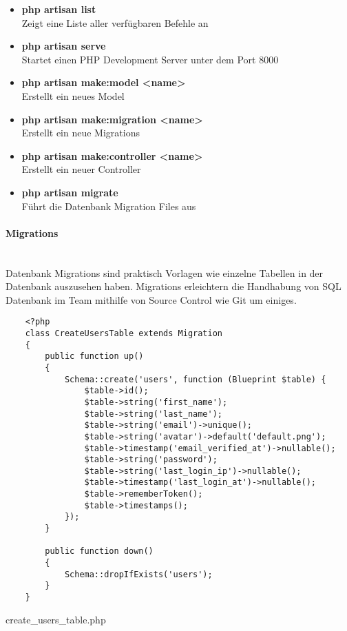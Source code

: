 \begin{itemize}
  \item \textbf{php artisan list}\\
  Zeigt eine Liste aller verfügbaren Befehle an
  \item \textbf{php artisan serve}\\
  Startet einen PHP Development Server unter dem Port 8000
  \item \textbf{php artisan make:model <name>}\\
  Erstellt ein neues Model
  \item \textbf{php artisan make:migration <name>}\\
  Erstellt ein neue Migrations
  \item \textbf{php artisan make:controller <name>}\\
  Erstellt ein neuer Controller
  \item \textbf{php artisan migrate}\\
  Führt die Datenbank Migration Files aus
\end{itemize}

\paragraph{Migrations}\mbox{}\\
Datenbank Migrations sind praktisch Vorlagen wie einzelne Tabellen in der
Datenbank auszusehen haben. Migrations erleichtern die Handhabung von SQL
Datenbank im Team mithilfe von Source Control wie Git um einiges.

\begin{listing}[H]
  \begin{verbatim}
    <?php
    class CreateUsersTable extends Migration
    {
        public function up()
        {
            Schema::create('users', function (Blueprint $table) {
                $table->id();
                $table->string('first_name');
                $table->string('last_name');
                $table->string('email')->unique();
                $table->string('avatar')->default('default.png');
                $table->timestamp('email_verified_at')->nullable();
                $table->string('password');
                $table->string('last_login_ip')->nullable();
                $table->timestamp('last_login_at')->nullable();
                $table->rememberToken();
                $table->timestamps();
            });
        }
    
        public function down()
        {
            Schema::dropIfExists('users');
        }
    }
  \end{verbatim}
  \caption{create\_users\_table.php}
  \label{lst:create_users_table}
\end{listing}

